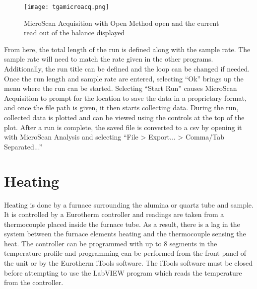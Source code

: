         \begin{figure}
            \begin{center}
            \texttt{[image: tgamicroacq.png]}
            \end{center}
            \caption{MicroScan Acquisition with Open Method open and the current read out of the balance displayed}
            \label{fig:tgamicroaq}
        \end{figure}

        From here, the total length of the run is defined along with the sample rate.
        The sample rate will need to match the rate given in the other programs.
        Additionally, the run title can be defined and the loop can be changed if needed.
        Once the run length and sample rate are entered, selecting ``Ok'' brings up the menu where the run can be started.
        Selecting ``Start Run'' causes MicroScan Acquisition to prompt for the location to save the data in a proprietary format, and once the file path is given, it then starts collecting data.
        During the run, collected data is plotted and can be viewed using the controls at the top of the plot.
        After a run is complete, the saved file is converted to a \gls{csv} by opening it with MicroScan Analysis and selecting ``File \textgreater{} Export... \textgreater{} Comma/Tab Separated...''

\section{Heating}
    Heating is done by a furnace surrounding the alumina or quartz tube and sample.
    It is controlled by a Eurotherm controller and readings are taken from a thermocouple placed inside the furnace tube.
    As a result, there is a lag in the system between the furnace elements heating and the thermocouple sensing the heat.
    The controller can be programmed with up to 8 segments in the temperature profile and programming can be performed from the front panel of the unit or by the Eurotherm iTools software.
    The iTools software must be closed before attempting to use the LabVIEW program which reads the temperature from the controller.

